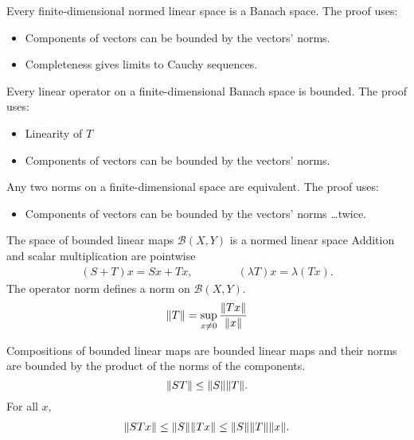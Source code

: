 \documentclass[avery5388,grid,frame]{flashcards}
\begin{document}
\begin{flashcard}
    {Every finite-dimensional normed linear space is a Banach space.}
    The proof uses:
    \begin{itemize}
        \item Components of vectors can be bounded by the vectors' norms.
        \item Completeness gives limits to Cauchy sequences.
    \end{itemize}
\end{flashcard}

\begin{flashcard}
    {Every linear operator on a finite-dimensional Banach space is bounded.}
    The proof uses:
    \begin{itemize}
        \item Linearity of $T$
        \item Components of vectors can be bounded by the vectors' norms.
    \end{itemize}
\end{flashcard}

\begin{flashcard}
    {Any two norms on a finite-dimensional space are equivalent.}
    The proof uses:
    \begin{itemize}
        \item Components of vectors can be bounded by the vectors' norms \dots twice.
    \end{itemize}
\end{flashcard}

\begin{flashcard}
    {The space of bounded linear maps $\mathcal{B}(X,Y)$ is a normed linear space}
    Addition and scalar multiplication are pointwise
    \begin{align*}
        (S + T)x = Sx + Tx, \qquad \qquad (\lambda T)x = \lambda(Tx).
    \end{align*}
    The operator norm defines a norm on $\mathcal{B}(X,Y)$.
    \begin{align*}
        \norm{T} = \sup_{x\neq 0}\frac{\norm{Tx}}{\norm{x}}
    \end{align*}
\end{flashcard}

\begin{flashcard}
    {Compositions of bounded linear maps are bounded linear maps and their norms are bounded by the product of the norms of the components. $$\norm{ST} \leq \norm{S}\norm{T}.$$}
    For all $x$,
    \begin{align*}
        \norm{STx} \leq \norm{S}\norm{Tx} \leq \norm{S} \norm{T} \norm{x}.
    \end{align*}
\end{flashcard}
\end{document}
